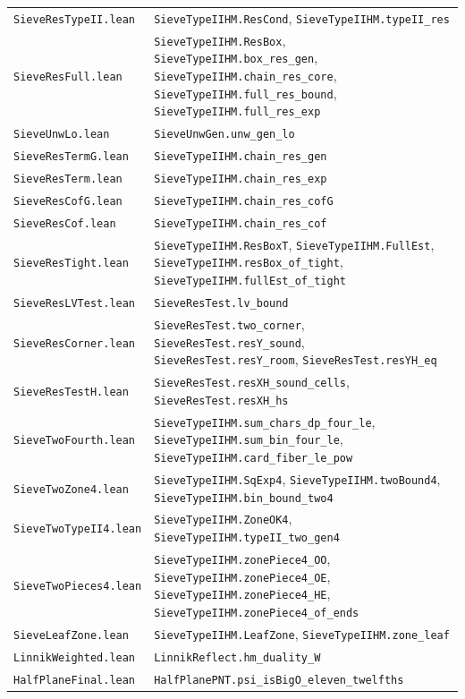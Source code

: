 \documentclass[11pt]{article}
\theoremstyle{definition}
\newcommand{\lean}[1]{\texttt{#1}}
\newcommand{\file}[1]{\nolinkurl{#1}}
\begin{document}
{\begin{longtable}{@{}l>{\raggedright\arraybackslash}p{}@{}}
\file{SieveResTypeII.lean} & \lean{SieveTypeIIHM.ResCond}, \lean{SieveTypeIIHM.typeII\_res} \\
\file{SieveResFull.lean} & \lean{SieveTypeIIHM.ResBox}, \lean{SieveTypeIIHM.box\_res\_gen},
\lean{SieveTypeIIHM.chain\_res\_core}, \lean{SieveTypeIIHM.full\_res\_bound}, \lean{SieveTypeIIHM.full\_res\_exp} \\
\file{SieveUnwLo.lean} & \lean{SieveUnwGen.unw\_gen\_lo} \\
\file{SieveResTermG.lean} & \lean{SieveTypeIIHM.chain\_res\_gen} \\
\file{SieveResTerm.lean} & \lean{SieveTypeIIHM.chain\_res\_exp} \\
\file{SieveResCofG.lean} & \lean{SieveTypeIIHM.chain\_res\_cofG} \\
\file{SieveResCof.lean} & \lean{SieveTypeIIHM.chain\_res\_cof} \\
\file{SieveResTight.lean} & \lean{SieveTypeIIHM.ResBoxT}, \lean{SieveTypeIIHM.FullEst},
\lean{SieveTypeIIHM.resBox\_of\_tight}, \lean{SieveTypeIIHM.fullEst\_of\_tight} \\
\file{SieveResLVTest.lean} & \lean{SieveResTest.lv\_bound} \\
\file{SieveResCorner.lean} & \lean{SieveResTest.two\_corner}, \lean{SieveResTest.resY\_sound},
\lean{SieveResTest.resY\_room}, \lean{SieveResTest.resYH\_eq} \\
\file{SieveResTestH.lean} & \lean{SieveResTest.resXH\_sound\_cells}, \lean{SieveResTest.resXH\_hs} \\
\file{SieveTwoFourth.lean} & \lean{SieveTypeIIHM.sum\_chars\_dp\_four\_le}, \lean{SieveTypeIIHM.sum\_bin\_four\_le},
\lean{SieveTypeIIHM.card\_fiber\_le\_pow} \\
\file{SieveTwoZone4.lean} & \lean{SieveTypeIIHM.SqExp4}, \lean{SieveTypeIIHM.twoBound4},
\lean{SieveTypeIIHM.bin\_bound\_two4} \\
\file{SieveTwoTypeII4.lean} & \lean{SieveTypeIIHM.ZoneOK4}, \lean{SieveTypeIIHM.typeII\_two\_gen4} \\
\file{SieveTwoPieces4.lean} & \lean{SieveTypeIIHM.zonePiece4\_OO}, \lean{SieveTypeIIHM.zonePiece4\_OE},
\lean{SieveTypeIIHM.zonePiece4\_HE}, \lean{SieveTypeIIHM.zonePiece4\_of\_ends} \\
\file{SieveLeafZone.lean} & \lean{SieveTypeIIHM.LeafZone}, \lean{SieveTypeIIHM.zone\_leaf} \\
\file{LinnikWeighted.lean} & \lean{LinnikReflect.hm\_duality\_W} \\
\file{HalfPlaneFinal.lean} & \lean{HalfPlanePNT.psi\_isBigO\_eleven\_twelfths} \\

\end{longtable}}
\end{document}
